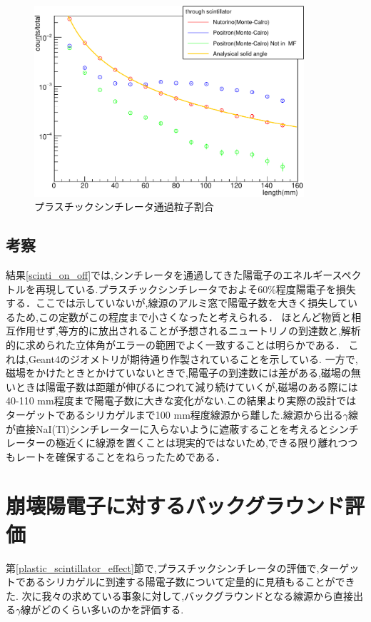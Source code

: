 \begin{figure}[htbp]
	\centering
		\includegraphics[width=10cm]{fig/scinti_test.pdf}
	\caption{プラスチックシンチレータ通過粒子割合}
	\label{scinti_test}
\end{figure}

\subsection{考察}

結果\ref{scinti_on_off}では,シンチレータを通過してきた陽電子のエネルギースペクトルを再現している.プラスチックシンチレータでおよそ60\%程度陽電子を損失する．ここでは示していないが,線源のアルミ窓で陽電子数を大きく損失しているため,この定数がこの程度まで小さくなったと考えられる．
ほとんど物質と相互作用せず,等方的に放出されることが予想されるニュートリノの到達数と,解析的に求められた立体角がエラーの範囲でよく一致することは明らかである．
これは,Geant4のジオメトリが期待通り作製されていることを示している.
一方で,磁場をかけたときとかけていないときで,陽電子の到達数には差がある,磁場の無いときは陽電子数は距離が伸びるにつれて減り続けていくが,磁場のある際には40-110 mm程度まで陽電子数に大きな変化がない.この結果より実際の設計ではターゲットであるシリカゲルまで100 mm程度線源から離した.線源から出る$\gamma$線が直接NaI(Tl)シンチレーターに入らないように遮蔽することを考えるとシンチレーターの極近くに線源を置くことは現実的ではないため,できる限り離れつつもレートを確保することをねらったためである．


\section{崩壊陽電子に対するバックグラウンド評価}

第\ref{plastic_scintillator_effect}節で,プラスチックシンチレータの評価で,ターゲットであるシリカゲルに到達する陽電子数について定量的に見積もることができた.
次に我々の求めている事象に対して,バックグラウンドとなる線源から直接出る$\gamma$線がどのくらい多いのかを評価する.


